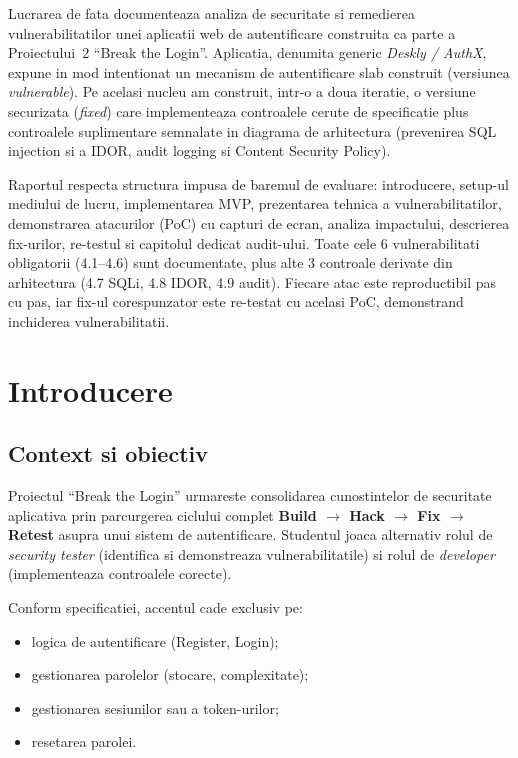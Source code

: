 \documentclass[12pt,a4paper]{article}
\begin{document}
Lucrarea de fata documenteaza analiza de securitate si remedierea
vulnerabilitatilor unei aplicatii web de autentificare construita ca
parte a Proiectului~2 ``Break the Login''. Aplicatia, denumita generic
\textit{Deskly / AuthX}, expune in mod intentionat un mecanism de
autentificare slab construit (versiunea \textit{vulnerable}). Pe acelasi
nucleu am construit, intr-o a doua iteratie, o versiune securizata
(\textit{fixed}) care implementeaza controalele cerute de specificatie
plus controalele suplimentare semnalate in diagrama de arhitectura
(prevenirea SQL injection si a IDOR, audit logging si Content Security
Policy).

Raportul respecta structura impusa de baremul de evaluare: introducere,
setup-ul mediului de lucru, implementarea MVP, prezentarea tehnica a
vulnerabilitatilor, demonstrarea atacurilor (PoC) cu capturi de ecran,
analiza impactului, descrierea fix-urilor, re-testul si capitolul dedicat
audit-ului. Toate cele 6 vulnerabilitati obligatorii (4.1--4.6) sunt
documentate, plus alte 3 controale derivate din arhitectura (4.7 SQLi,
4.8 IDOR, 4.9 audit). Fiecare atac este reproductibil pas cu pas, iar
fix-ul corespunzator este re-testat cu acelasi PoC, demonstrand
inchiderea vulnerabilitatii.

\newpage

\section{Introducere}\label{sec:intro}

\subsection{Context si obiectiv}
Proiectul ``Break the Login'' urmareste consolidarea cunostintelor de
securitate aplicativa prin parcurgerea ciclului complet
\textbf{Build $\rightarrow$ Hack $\rightarrow$ Fix $\rightarrow$ Retest}
asupra unui sistem de autentificare. Studentul joaca alternativ rolul de
\textit{security tester} (identifica si demonstreaza vulnerabilitatile)
si rolul de \textit{developer} (implementeaza controalele corecte).

Conform specificatiei, accentul cade exclusiv pe:
\begin{itemize}
  \item logica de autentificare (Register, Login);
  \item gestionarea parolelor (stocare, complexitate);
  \item gestionarea sesiunilor sau a token-urilor;
  \item resetarea parolei.
\end{itemize}
\end{document}
